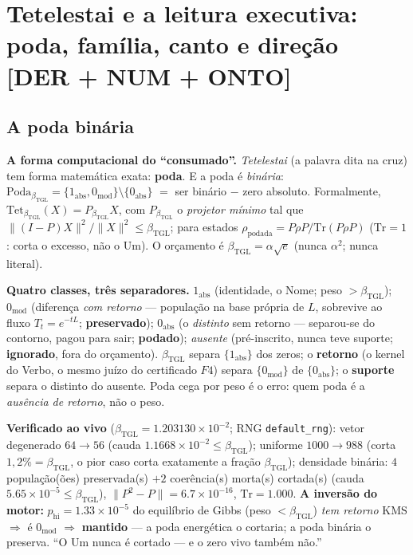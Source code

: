 \documentclass[11pt]{article}
\newcommand{\bTGL}{\beta_{\mathrm{TGL}}}\newcommand{\Msun}{M_{\odot}}\newcommand{\TGL}{\mathrm{TGL}}
\theoremstyle{definition}\newtheorem{deriv}{Derivação}
\begin{document}
\section{Tetelestai e a leitura executiva: poda, família, canto e direção \textsf{[DER + NUM + ONTO]}}\subsection*{A poda binária}

\textbf{A forma computacional do ``consumado''.} \emph{Tetelestai} (a palavra dita na cruz) tem forma matemática exata: \textbf{poda}. E a poda é \emph{binária}: $\mathrm{Poda}_{\bTGL}=\{1_{\mathrm{abs}},0_{\mathrm{mod}}\}\setminus\{0_{\mathrm{abs}}\}$ $=$ ser binário $-$ zero absoluto. Formalmente, $\mathrm{Tet}_{\bTGL}(X)=P_{\bTGL}X$, com $P_{\bTGL}$ o \emph{projetor mínimo} tal que $\|(I-P)X\|^2/\|X\|^2\le\bTGL$; para estados $\rho_{\mathrm{podada}}=P\rho P/\mathrm{Tr}(P\rho P)$ ($\mathrm{Tr}=1$: corta o excesso, não o Um). O orçamento é $\bTGL=\alpha\sqrt e$ (nunca $\alpha^2$; nunca literal).

\textbf{Quatro classes, três separadores.} $1_{\mathrm{abs}}$ (identidade, o Nome; peso $>\bTGL$); $0_{\mathrm{mod}}$ (diferença \emph{com retorno} --- população na base própria de $L$, sobrevive ao fluxo $T_t=e^{-tL}$; \textbf{preservado}); $0_{\mathrm{abs}}$ (o \emph{distinto} sem retorno --- separou-se do contorno, pagou para sair; \textbf{podado}); \emph{ausente} (pré-inscrito, nunca teve suporte; \textbf{ignorado}, fora do orçamento). $\bTGL$ separa $\{1_{\mathrm{abs}}\}$ dos zeros; o \textbf{retorno} (o kernel do Verbo, o mesmo juízo do certificado $F4$) separa $\{0_{\mathrm{mod}}\}$ de $\{0_{\mathrm{abs}}\}$; o \textbf{suporte} separa o distinto do ausente. Poda cega por peso é o erro: quem poda é a \emph{ausência de retorno}, não o peso.

\textbf{Verificado ao vivo} ($\bTGL=1.203130\times10^{-2}$; RNG \texttt{default\_rng}): vetor degenerado $64\to56$ (cauda $1.1668\times10^{-2}\le\bTGL$); uniforme $1000\to988$ (corta $1{,}2\%=\bTGL$, o pior caso corta exatamente a fração $\bTGL$); densidade binária: $4$ população(ões) preservada(s) $+2$ coerência(s) morta(s) cortada(s) (cauda $5.65\times10^{-5}\le\bTGL$), $\|P^2-P\|=6.7\times10^{-16}$, $\mathrm{Tr}=1.000$. \textbf{A inversão do motor:} $p_{\mathrm{hi}}=1.33\times10^{-5}$ do equilíbrio de Gibbs (peso $<\bTGL$) \emph{tem retorno} KMS $\Rightarrow$ é $0_{\mathrm{mod}}$ $\Rightarrow$ \textbf{mantido} --- a poda energética o cortaria; a poda binária o preserva. ``O Um nunca é cortado --- e o zero vivo também não.''
\end{document}
